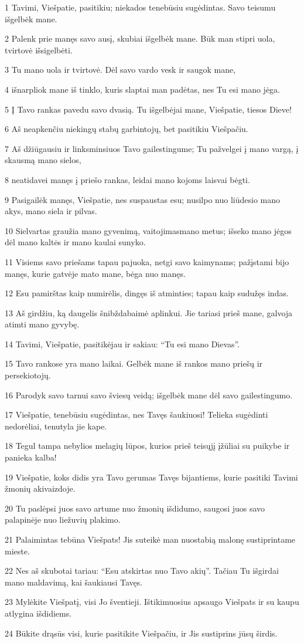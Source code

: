 \par 1 Tavimi, Viešpatie, pasitikiu; niekados tenebūsiu sugėdintas. Savo teisumu išgelbėk mane. 
\par 2 Palenk prie manęs savo ausį, skubiai išgelbėk mane. Būk man stipri uola, tvirtovė išsigelbėti. 
\par 3 Tu mano uola ir tvirtovė. Dėl savo vardo vesk ir saugok mane, 
\par 4 išnarpliok mane iš tinklo, kuris slaptai man padėtas, nes Tu esi mano jėga. 
\par 5 Į Tavo rankas pavedu savo dvasią. Tu išgelbėjai mane, Viešpatie, tiesos Dieve! 
\par 6 Aš neapkenčiu niekingų stabų garbintojų, bet pasitikiu Viešpačiu. 
\par 7 Aš džiūgausiu ir linksminsiuos Tavo gailestingume; Tu pažvelgei į mano vargą, į skausmą mano sielos, 
\par 8 neatidavei manęs į priešo rankas, leidai mano kojoms laisvai bėgti. 
\par 9 Pasigailėk manęs, Viešpatie, nes suspaustas esu; nusilpo nuo liūdesio mano akys, mano siela ir pilvas. 
\par 10 Sielvartas graužia mano gyvenimą, vaitojimas­mano metus; išseko mano jėgos dėl mano kaltės ir mano kaulai sunyko. 
\par 11 Visiems savo priešams tapau pajuoka, netgi savo kaimynams; pažįstami bijo manęs, kurie gatvėje mato mane, bėga nuo manęs. 
\par 12 Esu pamirštas kaip numirėlis, dingęs iš atminties; tapau kaip sudužęs indas. 
\par 13 Aš girdžiu, ką daugelis šnibžda­baimė aplinkui. Jie tariasi prieš mane, galvoja atimti mano gyvybę. 
\par 14 Tavimi, Viešpatie, pasitikėjau ir sakiau: “Tu esi mano Dievas”. 
\par 15 Tavo rankose yra mano laikai. Gelbėk mane iš rankos mano priešų ir persekiotojų. 
\par 16 Parodyk savo tarnui savo šviesų veidą; išgelbėk mane dėl savo gailestingumo. 
\par 17 Viešpatie, tenebūsiu sugėdintas, nes Tavęs šaukiuosi! Telieka sugėdinti nedorėliai, tenutyla jie kape. 
\par 18 Tegul tampa nebylios melagių lūpos, kurios prieš teisųjį įžūliai su puikybe ir panieka kalba! 
\par 19 Viešpatie, koks didis yra Tavo gerumas Tavęs bijantiems, kurie pasitiki Tavimi žmonių akivaizdoje. 
\par 20 Tu paslėpsi juos savo artume nuo žmonių išdidumo, saugosi juos savo palapinėje nuo liežuvių plakimo. 
\par 21 Palaimintas tebūna Viešpats! Jis suteikė man nuostabią malonę sustiprintame mieste. 
\par 22 Nes aš skubotai tariau: “Esu atskirtas nuo Tavo akių”. Tačiau Tu išgirdai mano maldavimą, kai šaukiausi Tavęs. 
\par 23 Mylėkite Viešpatį, visi Jo šventieji. Ištikimuosius apsaugo Viešpats ir su kaupu atlygina išdidiems. 
\par 24 Būkite drąsūs visi, kurie pasitikite Viešpačiu, ir Jis sustiprins jūsų širdis.



